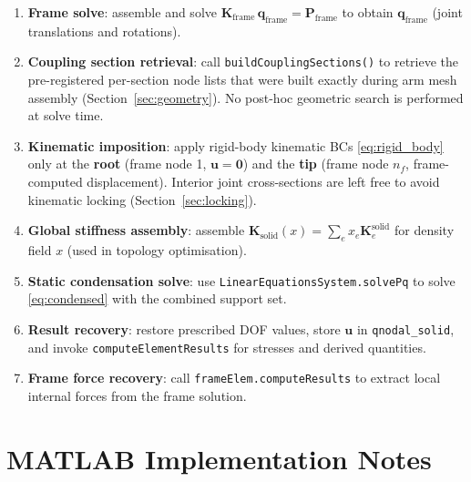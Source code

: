\documentclass{article}
\begin{document}
\begin{enumerate}
    \item \textbf{Frame solve}: assemble and solve
          $\bm{K}_{\text{frame}}\,\bm{q}_{\text{frame}} = \bm{P}_{\text{frame}}$
          to obtain $\bm{q}_{\text{frame}}$ (joint translations and rotations).

    \item \textbf{Coupling section retrieval}: call
          \texttt{buildCouplingSections()} to retrieve the pre-registered
          per-section node lists that were built exactly during arm mesh
          assembly (Section~\ref{sec:geometry}).  No post-hoc geometric
          search is performed at solve time.

    \item \textbf{Kinematic imposition}: apply rigid-body kinematic BCs
          \eqref{eq:rigid_body} only at the \textbf{root} (frame node 1,
          $\bm{u}=\bm{0}$) and the \textbf{tip} (frame node $n_f$,
          frame-computed displacement).  Interior joint cross-sections are
          left free to avoid kinematic locking (Section~\ref{sec:locking}).

    \item \textbf{Global stiffness assembly}: assemble
          $\bm{K}_{\text{solid}}(x) = \sum_e x_e \bm{K}_e^{\text{solid}}$
          for density field $x$ (used in topology optimisation).

    \item \textbf{Static condensation solve}: use \texttt{LinearEquationsSystem.solvePq}
          to solve \eqref{eq:condensed} with the combined support set.

    \item \textbf{Result recovery}: restore prescribed DOF values, store
          $\bm{u}$ in \texttt{qnodal\_solid}, and invoke
          \texttt{computeElementResults} for stresses and derived quantities.

    \item \textbf{Frame force recovery}: call \texttt{frameElem.computeResults}
          to extract local internal forces from the frame solution.
\end{enumerate}

\section{MATLAB Implementation Notes}
\label{sec:matlab}
\end{document}
